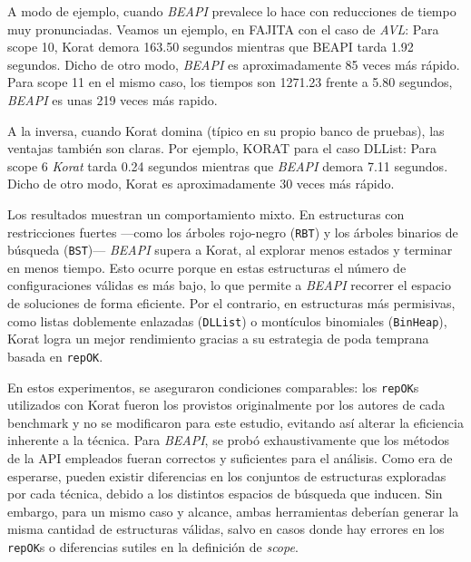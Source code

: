 A modo de ejemplo, cuando \emph{BEAPI} prevalece lo hace con reducciones de tiempo muy pronunciadas. Veamos un ejemplo,
en \textsf{FAJITA} con el caso de \emph{AVL}:
Para scope 10, Korat demora 163.50 segundos mientras que BEAPI tarda 1.92 segundos. 
Dicho de otro modo, \emph{BEAPI} es aproximadamente 85 veces más rápido. 
Para scope 11 en el mismo caso, los tiempos son 1271.23 frente a 5.80 segundos, \emph{BEAPI}
es unas 219 veces más rapido. 

A la inversa, cuando \textsf{Korat} domina (típico en su propio banco de pruebas), las ventajas también son claras. 
Por ejemplo, \textsf{KORAT} para el caso \textsf{DLList}:
Para scope 6 \emph{Korat} tarda 0.24 segundos mientras que \emph{BEAPI} demora 7.11 segundos. 
Dicho de otro modo, \textsf{Korat} es aproximadamente 30 veces más rápido. 

Los resultados muestran un comportamiento mixto. En estructuras con restricciones fuertes —como los 
árboles rojo-negro (\texttt{RBT}) y los árboles binarios de búsqueda (\texttt{BST})— \emph{BEAPI} 
supera a \textsf{Korat}, al explorar menos estados y terminar en menos tiempo. Esto ocurre porque 
en estas estructuras el número de configuraciones válidas es más bajo, lo que permite a \emph{BEAPI} 
recorrer el espacio de soluciones de forma eficiente. Por el contrario, en estructuras más permisivas, 
como listas doblemente enlazadas (\texttt{DLList}) o montículos binomiales (\texttt{BinHeap}), 
\textsf{Korat} logra un mejor rendimiento gracias a su estrategia de poda temprana basada en 
\texttt{repOK}.

En estos experimentos, se aseguraron condiciones comparables: los \texttt{repOK}s utilizados con 
\textsf{Korat} fueron los provistos originalmente por los autores de cada benchmark y no se 
modificaron para este estudio, evitando así alterar la eficiencia inherente a la técnica. 
Para \emph{BEAPI}, se probó exhaustivamente que los métodos de la API empleados fueran correctos 
y suficientes para el análisis. Como era de esperarse, pueden existir diferencias en los conjuntos 
de estructuras exploradas por cada técnica, debido a los distintos espacios de búsqueda que inducen. 
Sin embargo, para un mismo caso y alcance, ambas herramientas deberían generar la misma cantidad 
de estructuras válidas, salvo en casos donde hay errores en los \texttt{repOK}s o diferencias sutiles 
en la definición de \emph{scope}.

